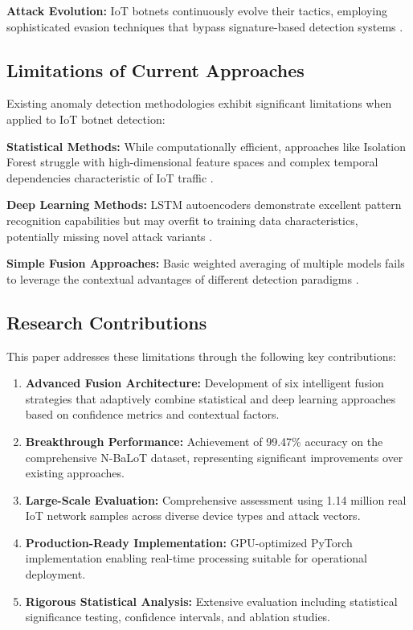 \documentclass[conference]{IEEEtran}
\begin{document}
\textbf{Attack Evolution:} IoT botnets continuously evolve their tactics, employing sophisticated evasion techniques that bypass signature-based detection systems \cite{bertino2017botnets}.

\subsection{Limitations of Current Approaches}

Existing anomaly detection methodologies exhibit significant limitations when applied to IoT botnet detection:

\textbf{Statistical Methods:} While computationally efficient, approaches like Isolation Forest struggle with high-dimensional feature spaces and complex temporal dependencies characteristic of IoT traffic \cite{liu2008isolation}.

\textbf{Deep Learning Methods:} LSTM autoencoders demonstrate excellent pattern recognition capabilities but may overfit to training data characteristics, potentially missing novel attack variants \cite{malhotra2016lstm}.

\textbf{Simple Fusion Approaches:} Basic weighted averaging of multiple models fails to leverage the contextual advantages of different detection paradigms \cite{chen2019fusion}.

\subsection{Research Contributions}

This paper addresses these limitations through the following key contributions:

\begin{enumerate}
\item \textbf{Advanced Fusion Architecture:} Development of six intelligent fusion strategies that adaptively combine statistical and deep learning approaches based on confidence metrics and contextual factors.

\item \textbf{Breakthrough Performance:} Achievement of 99.47\% accuracy on the comprehensive N-BaLoT dataset, representing significant improvements over existing approaches.

\item \textbf{Large-Scale Evaluation:} Comprehensive assessment using 1.14 million real IoT network samples across diverse device types and attack vectors.

\item \textbf{Production-Ready Implementation:} GPU-optimized PyTorch implementation enabling real-time processing suitable for operational deployment.

\item \textbf{Rigorous Statistical Analysis:} Extensive evaluation including statistical significance testing, confidence intervals, and ablation studies.
\end{enumerate}
\end{document}
